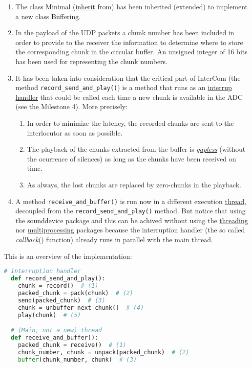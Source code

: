 \begin{enumerate}
\item The class Minimal
  (\href{https://en.wikipedia.org/wiki/Inheritance_(object-oriented_programming)}{inherit}
  from) has been inherited (extended) to implement a new class
  Buffering.
\item In the payload of the UDP packets a chunk number has been
  included in order to provide to the receiver the information to
  determine where to store the corresponding chunk in the circular
  buffer. An unsigned integer of 16 bits has been used for
  representing the chunk numbers.
\item It has been taken into consideration that the critical part of
  InterCom (the method \verb|record_send_and_play()|) is a method that
  runs as an
  \href{https://en.wikipedia.org/wiki/Interrupt_handler}{interrup
    handler} that could be called each time a new chunk is available
  in the ADC (see the Milestone 4). More precisely:
  \begin{enumerate}
  \item In order to minimize the latency, the recorded chunks are sent
    to the interlocutor as soon as possible.
  \item The playback of the chunks extracted from the buffer is
    \href{https://en.wikipedia.org/wiki/Gapless_playback}{\emph{gapless}}
    (without the ocurrence of silences) as long as the chunks have
    been received on time.
  \item As always, the lost chunks are replaced by zero-chunks
    in the playback.
  \end{enumerate}
\item A method \verb|receive_and_buffer()| is run now in a different
  execution
  \href{https://en.wikipedia.org/wiki/Thread_(computing)}{thread},
  decoupled from the \verb|record_send_and_play()| method. But notice
  that using the sounddevice package and this can be achived without using the
  \href{https://docs.python.org/3/library/threading.html}{threading}
  nor
  \href{https://docs.python.org/3/library/multiprocessing.html}{multiprocessing}
  packages because the interruption handler (the so called
  \emph{callback}() function) already runs in parallel with the main
  thread.
\end{enumerate}

This is an overview of the implementation:

\begin{lstlisting}[language=Python]
  # Interruption handler
  def record_send_and_play():
    chunk = record()  # (1)
    packed_chunk = pack(chunk)  # (2)
    send(packed_chunk)  # (3)
    chunk = unbuffer_next_chunk()  # (4)
    play(chunk)  # (5)

  # (Main, not a new) thread
  def receive_and_buffer():
    packed_chunk = receive()  # (1)
    chunk_number, chunk = unpack(packed_chunk)  # (2)
    buffer(chunk_number, chunk)  # (3)
\end{lstlisting}

